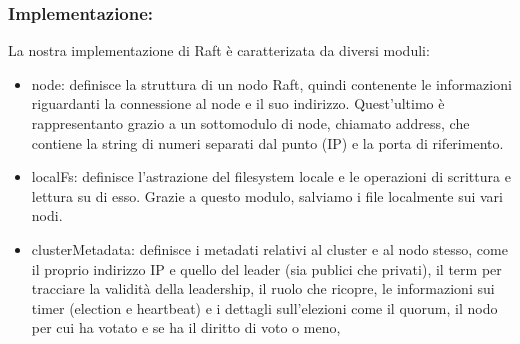 \subsubsection{Implementazione:\\}
La nostra implementazione di Raft è caratterizata da diversi moduli: 
\begin{itemize}
  \item node: definisce la struttura di un nodo Raft, quindi contenente le informazioni riguardanti la connessione al node e il suo indirizzo. Quest'ultimo è rappresentanto grazio a un sottomodulo di node, chiamato address, 
    che contiene la string di numeri separati dal punto (IP) e la porta di riferimento.

  \item localFs: definisce l'astrazione del filesystem locale e le operazioni di scrittura e lettura su di esso. Grazie a questo modulo, salviamo i file localmente sui vari nodi.
  
  \item clusterMetadata: definisce i metadati relativi al cluster e al nodo stesso, come il proprio indirizzo IP e quello del leader (sia publici che privati), il term per tracciare la validità della leadership, il ruolo 
    che ricopre, le informazioni sui timer (election e heartbeat) e i dettagli 
    sull'elezioni come il quorum, il nodo per cui ha votato e se ha il diritto di voto o meno, 
 

\end{itemize}
